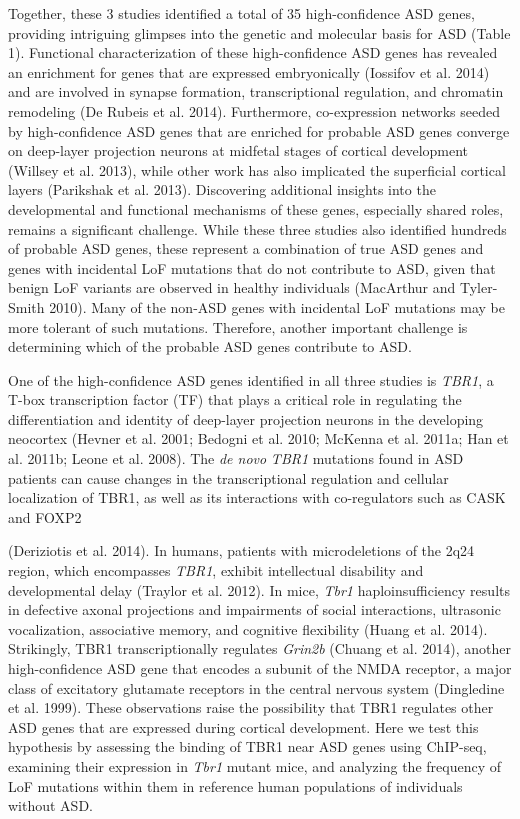 \documentclass[]{article}
\begin{document}
Together, these 3 studies identified a total of 35 high-confidence ASD
genes, providing intriguing glimpses into the genetic and molecular
basis for ASD (Table 1). Functional characterization of these
high-confidence ASD genes has revealed an enrichment for genes that are
expressed embryonically (Iossifov et al. 2014) and are involved in
synapse formation, transcriptional regulation, and chromatin remodeling
(De Rubeis et al. 2014). Furthermore, co-expression networks seeded by
high-confidence ASD genes that are enriched for probable ASD genes
converge on deep-layer projection neurons at midfetal stages of cortical
development (Willsey et al. 2013), while other work has also implicated
the superficial cortical layers (Parikshak et al. 2013). Discovering
additional insights into the developmental and functional mechanisms of
these genes, especially shared roles, remains a significant challenge.
While these three studies also identified hundreds of probable ASD
genes, these represent a combination of true ASD genes and genes with
incidental LoF mutations that do not contribute to ASD, given that
benign LoF variants are observed in healthy individuals (MacArthur and
Tyler-Smith 2010). Many of the non-ASD genes with incidental LoF
mutations may be more tolerant of such mutations. Therefore, another
important challenge is determining which of the probable ASD genes
contribute to ASD.

One of the high-confidence ASD genes identified in all three studies is
\emph{TBR1}, a T-box transcription factor (TF) that plays a critical
role in regulating the differentiation and identity of deep-layer
projection neurons in the developing neocortex (Hevner et al. 2001;
Bedogni et al. 2010; McKenna et al. 2011a; Han et al. 2011b; Leone et
al. 2008). The \emph{de novo} \emph{TBR1} mutations found in ASD
patients can cause changes in the transcriptional regulation and
cellular localization of TBR1, as well as its interactions with
co-regulators such as CASK and FOXP2

(Deriziotis et al. 2014). In humans, patients with microdeletions of the
2q24 region, which encompasses \emph{TBR1}, exhibit intellectual
disability and developmental delay (Traylor et al. 2012). In mice,
\emph{Tbr1} haploinsufficiency results in defective axonal projections
and impairments of social interactions, ultrasonic vocalization,
associative memory, and cognitive flexibility (Huang et al. 2014).
Strikingly, TBR1 transcriptionally regulates \emph{Grin2b} (Chuang et
al. 2014), another high-confidence ASD gene that encodes a subunit of
the NMDA receptor, a major class of excitatory glutamate receptors in
the central nervous system (Dingledine et al. 1999). These observations
raise the possibility that TBR1 regulates other ASD genes that are
expressed during cortical development. Here we test this hypothesis by
assessing the binding of TBR1 near ASD genes using ChIP-seq, examining
their expression in \emph{Tbr1} mutant mice, and analyzing the frequency
of LoF mutations within them in reference human populations of
individuals without ASD.
\end{document}
